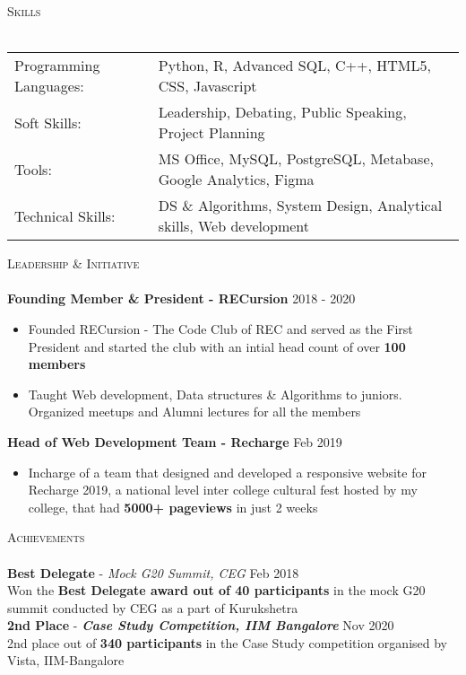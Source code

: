\documentclass[a4paper]{article}
\newcommand{\lineunder} {
    \vspace*{-8pt} \\
    \hspace*{-18pt} \hrulefill \\
}
\newcommand{\header} [1] {
    {\hspace*{-18pt}\vspace*{6pt} \textsc{#1}}
    \vspace*{-6pt} \lineunder
}
\begin{document}
\header{Skills}
\begin{tabular}{ l l }
    Programming Languages: & Python, R, Advanced SQL, C++, HTML5, CSS, Javascript\\
    Soft Skills:           & Leadership, Debating, Public Speaking, Project Planning\\
    Tools:                 & MS Office, MySQL, PostgreSQL, Metabase, Google Analytics, Figma\\
    Technical Skills:      & DS \& Algorithms, System Design, Analytical skills, Web development\\
\end{tabular}
\vspace{2mm}

\header{Leadership \& Initiative}
{\textbf{Founding Member \& President - RECursion}} \hfill 2018 - 2020
\begin{itemize} \itemsep 0.5pt
     \item Founded RECursion - The Code Club of REC and served as the First President and started the club with an intial head count of over \textbf{100 members}
     \item Taught Web development, Data structures \& Algorithms to juniors. Organized meetups and Alumni lectures for all the members
\end{itemize}
{\textbf{Head of Web Development Team - Recharge}} \hfill Feb 2019
\begin{itemize} \itemsep 0.5pt
     \item Incharge of a team that designed and developed a responsive website for Recharge 2019, a national level inter college cultural fest hosted by my college, that had \textbf{5000+ pageviews} in just 2 weeks
\end{itemize}
\vspace*{2mm}

\header{Achievements}
{\textbf{Best Delegate}} - {\sl Mock G20 Summit, CEG} \hfill Feb 2018\\
Won the \textbf{Best Delegate award out of 40 participants} in the mock G20 summit conducted by CEG as a part of Kurukshetra\\
\vspace*{2mm}
{\textbf{2nd Place}} - {\sl \textbf{Case Study Competition, IIM Bangalore}} \hfill Nov 2020\\
2nd place out of \textbf{340 participants} in the Case Study competition organised by Vista, IIM-Bangalore\\
\vspace*{2mm}


\ 
\end{document}

